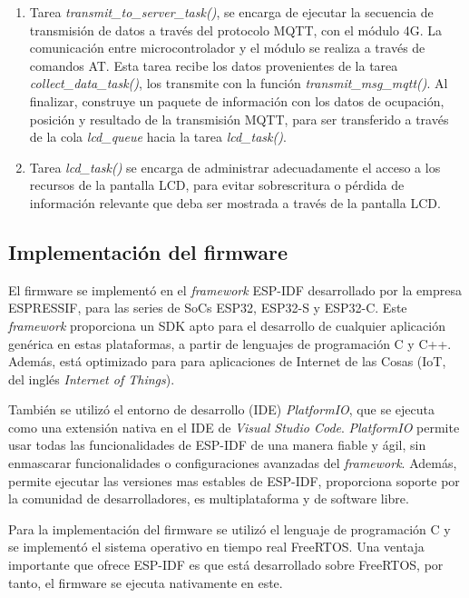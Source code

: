 \begin{enumerate}
	\item Tarea \textit{transmit\_to\_server\_task()}, se encarga de ejecutar la secuencia de transmisión de datos a través del protocolo MQTT, con el módulo 4G. La comunicación entre microcontrolador y el módulo se realiza a través de comandos AT. Esta tarea recibe los datos provenientes de la tarea \textit{collect\_data\_task()}, los transmite con la función \textit{transmit\_msg\_mqtt()}. Al finalizar, construye un paquete de información con los datos de ocupación, posición y resultado de la transmisión MQTT, para ser transferido a través de la cola \textit{lcd\_queue} hacia la tarea \textit{lcd\_task()}. 
		
	\item Tarea \textit{lcd\_task()} se encarga de administrar adecuadamente el acceso a los recursos de la pantalla LCD, para evitar sobrescritura o pérdida de información relevante que deba ser mostrada a través de la pantalla LCD. 
\end{enumerate}



\subsection{Implementación del firmware}
\label{sec:implementacion_firmware}

El firmware se implementó en el \textit{framework} ESP-IDF desarrollado por la empresa ESPRESSIF, para las series de SoCs ESP32, ESP32-S y ESP32-C. Este \textit{framework} proporciona un SDK apto para el desarrollo de cualquier aplicación genérica en estas plataformas, a partir de lenguajes de programación C y C++. Además, está optimizado para para aplicaciones de Internet de las Cosas (IoT, del inglés \textit{Internet of Things}). 

También se utilizó el entorno de desarrollo (IDE) \textit{PlatformIO}, que se ejecuta como una extensión nativa en el IDE de \textit{Visual Studio Code}. \textit{PlatformIO} permite usar todas las funcionalidades de ESP-IDF de una manera fiable y ágil, sin enmascarar funcionalidades o configuraciones avanzadas del \textit{framework}. Además, permite ejecutar las versiones mas estables de ESP-IDF, proporciona soporte por la comunidad de desarrolladores, es multiplataforma y de software libre. 

Para la implementación del firmware se utilizó el lenguaje de programación C y se implementó el sistema operativo en tiempo real FreeRTOS. Una ventaja importante que ofrece ESP-IDF es que está desarrollado sobre FreeRTOS, por tanto, el firmware se ejecuta nativamente en este.

